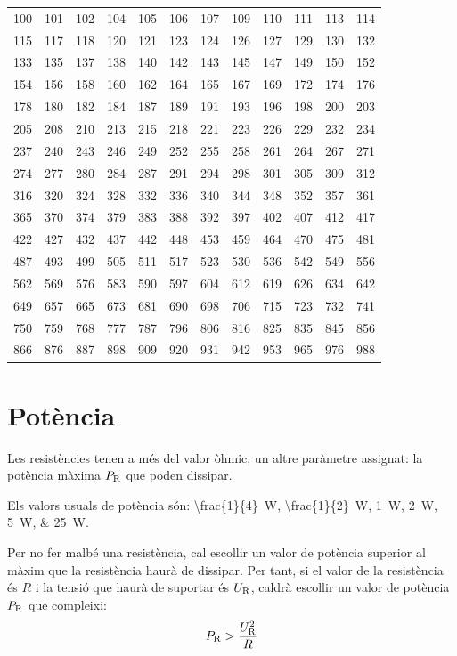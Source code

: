 \vspace{3mm}
\begin{center}
   \begin{tabular}{cccccccccccc}
   \toprule[1pt]
   100 & 101 & 102 & 104 & 105 & 106 & 107 & 109 & 110 & 111 & 113 & 114 \\
   115 & 117 & 118 & 120 & 121 & 123 & 124 & 126 & 127 & 129 & 130 & 132 \\
   133 & 135 & 137 & 138 & 140 & 142 & 143 & 145 & 147 & 149 & 150 & 152 \\
   154 & 156 & 158 & 160 & 162 & 164 & 165 & 167 & 169 & 172 & 174 & 176 \\
   178 & 180 & 182 & 184 & 187 & 189 & 191 & 193 & 196 & 198 & 200 & 203 \\
   205 & 208 & 210 & 213 & 215 & 218 & 221 & 223 & 226 & 229 & 232 & 234 \\
   237 & 240 & 243 & 246 & 249 & 252 & 255 & 258 & 261 & 264 & 267 & 271 \\
   274 & 277 & 280 & 284 & 287 & 291 & 294 & 298 & 301 & 305 & 309 & 312 \\
   316 & 320 & 324 & 328 & 332 & 336 & 340 & 344 & 348 & 352 & 357 & 361 \\
   365 & 370 & 374 & 379 & 383 & 388 & 392 & 397 & 402 & 407 & 412 & 417 \\
   422 & 427 & 432 & 437 & 442 & 448 & 453 & 459 & 464 & 470 & 475 & 481 \\
   487 & 493 & 499 & 505 & 511 & 517 & 523 & 530 & 536 & 542 & 549 & 556 \\
   562 & 569 & 576 & 583 & 590 & 597 & 604 & 612 & 619 & 626 & 634 & 642 \\
   649 & 657 & 665 & 673 & 681 & 690 & 698 & 706 & 715 & 723 & 732 & 741 \\
   750 & 759 & 768 & 777 & 787 & 796 & 806 & 816 & 825 & 835 & 845 & 856 \\
   866 & 876 & 887 & 898 & 909 & 920 & 931 & 942 & 953 & 965 & 976 & 988 \\
   \bottomrule[1pt]
   \end{tabular}
\end{center}


\section{Potència} \label{sec:resist-pot}

Les resistències tenen a més del valor òhmic, un altre paràmetre assignat: la potència màxima $P_\mathrm{R}$ que poden dissipar.

Els valors usuals de potència són: \qtylist[parse-numbers = false]{\frac{1}{4}; \frac{1}{2}; 1; 2; 5; 25}{W}.

Per no fer malbé una resistència, cal escollir un valor de potència superior al màxim que la resistència haurà de dissipar. Per tant, si el valor de la resistència és $R$ i la tensió  que haurà de suportar és $U_\mathrm{R}$, caldrà escollir un valor de potència $P_\mathrm{R}$ que compleixi:
\begin{equation}
  P_\mathrm{R} > \frac{U_\mathrm{R}^2}{R}
\end{equation}
